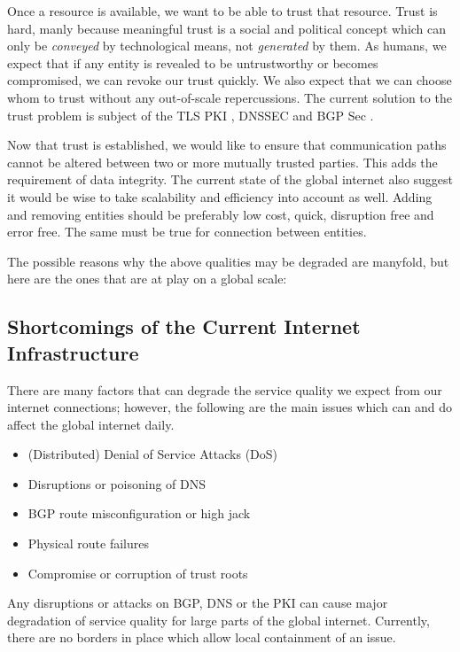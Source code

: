 \documentclass[../eva1_scion.tex]{subfiles}
\begin{document}
Once a resource is available, we want to be able to trust that resource. Trust is hard, manly because meaningful trust is a social and political concept which can only be \textit{conveyed} by technological means, not \textit{generated} by them. As humans, we expect that if any entity is revealed to be untrustworthy or becomes compromised, we can revoke our trust quickly. We also expect that we can choose whom to trust without any out-of-scale repercussions. The current solution to the trust problem is subject of the TLS PKI \cite{tls_pki}, DNSSEC \cite{dnssec} and BGP Sec \cite{bgpsec}.

Now that trust is established, we would like to ensure that communication paths cannot be altered between two or more mutually trusted parties. This adds the requirement of data integrity. The current state of the global internet also suggest it would be wise to take scalability and efficiency into account as well. Adding and removing entities should be preferably low cost, quick, disruption free and error free. The same must be true for connection between entities.

The possible reasons why the above qualities may be degraded are manyfold, but here are the ones that are at play on a global scale:

\subsection{Shortcomings of the Current Internet Infrastructure}%
\label{ssec:shortcomings}

There are many factors that can degrade the service quality we expect from our internet connections; however, the following are the main issues which can and do affect the global internet daily.

    \begin{itemize}
        \item (Distributed) Denial of Service Attacks (DoS)
        \item Disruptions or poisoning of DNS
        \item BGP route misconfiguration or high jack
        \item Physical route failures
        \item Compromise or corruption of trust roots
    \end{itemize}

    Any disruptions or attacks on BGP, DNS or the PKI can cause major degradation of service quality for large parts of the global internet. Currently, there are no borders in place which allow local containment of an issue.
\end{document}
